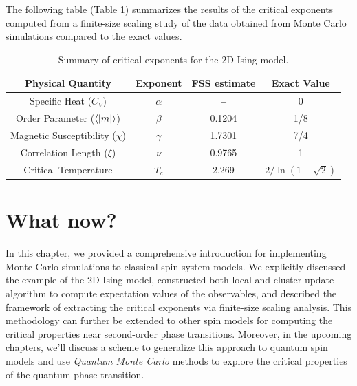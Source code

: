 \documentclass[../journal_main.tex]{subfiles}
\begin{document}
\FloatBarrier \!\!\!\!\!\!\!\!\!\!\!
The following table (Table \ref{critical}) summarizes the results of the critical exponents computed from a finite-size scaling study of the data obtained from Monte Carlo simulations compared to the exact values.
\begin{table}[h!]
    \begin{center}
    \begin{tabular}{||c c c c||}
    \hline
    Physical Quantity & Exponent & FSS estimate  & Exact Value \\ \hline\hline
    Specific Heat ($C_V$) & $\alpha$ & \textbf{--} & 0 \\ \hline
    Order Parameter ($\expval{|m|}$) & $\beta$ & 0.1204 & 1/8 \\ \hline
    Magnetic Susceptibility ($\chi$) & $\gamma$ & 1.7301 & 7/4 \\ \hline
    Correlation Length ($\xi$) & $\nu$ & 0.9765 & 1 \\ \hline
    Critical Temperature & $T_c$ & 2.269  & $2/\ln(1+\sqrt{2})$ \\
    \hline
    \end{tabular}
    \caption{Summary of critical exponents for the 2D Ising model.}
    \label{critical}
    \end{center}   
\end{table}
\section{What now?}
In this chapter, we provided a comprehensive introduction for implementing Monte Carlo simulations to classical spin system models. We explicitly discussed the example of the 2D Ising model, constructed both local and cluster update algorithm to compute expectation values of the observables, and described the framework of extracting the critical exponents via finite-size scaling analysis. This methodology can further be extended to other spin models for computing the critical properties near second-order phase transitions. Moreover, in the upcoming chapters, we'll discuss a scheme to generalize this approach to quantum spin models and use \textit{Quantum Monte Carlo} methods to explore the critical properties of the quantum phase transition. 
\end{document}
